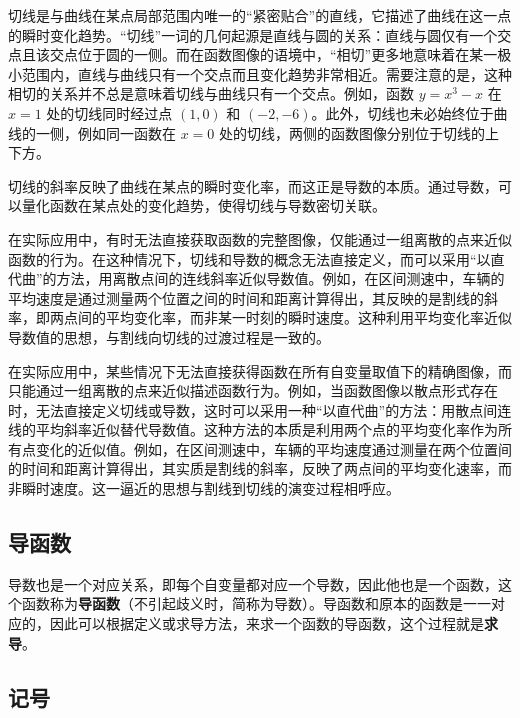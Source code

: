 切线是与曲线在某点局部范围内唯一的“紧密贴合”的直线，它描述了曲线在这一点的瞬时变化趋势。“切线”一词的几何起源是直线与圆的关系：直线与圆仅有一个交点且该交点位于圆的一侧。而在函数图像的语境中，“相切”更多地意味着在某一极小范围内，直线与曲线只有一个交点而且变化趋势非常相近。需要注意的是，这种相切的关系并不总是意味着切线与曲线只有一个交点。例如，函数 $y = x^3 - x$ 在 $x = 1$ 处的切线同时经过点 $(1, 0)$ 和 $(-2, -6)$。此外，切线也未必始终位于曲线的一侧，例如同一函数在 $x = 0$ 处的切线，两侧的函数图像分别位于切线的上下方。




切线的斜率反映了曲线在某点的瞬时变化率，而这正是导数的本质。通过导数，可以量化函数在某点处的变化趋势，使得切线与导数密切关联。

在实际应用中，有时无法直接获取函数的完整图像，仅能通过一组离散的点来近似函数的行为。在这种情况下，切线和导数的概念无法直接定义，而可以采用“以直代曲”的方法，用离散点间的连线斜率近似导数值。例如，在区间测速中，车辆的平均速度是通过测量两个位置之间的时间和距离计算得出，其反映的是割线的斜率，即两点间的平均变化率，而非某一时刻的瞬时速度。这种利用平均变化率近似导数值的思想，与割线向切线的过渡过程是一致的。



在实际应用中，某些情况下无法直接获得函数在所有自变量取值下的精确图像，而只能通过一组离散的点来近似描述函数行为。例如，当函数图像以散点形式存在时，无法直接定义切线或导数，这时可以采用一种“以直代曲”的方法：用散点间连线的平均斜率近似替代导数值。这种方法的本质是利用两个点的平均变化率作为所有点变化的近似值。例如，在区间测速中，车辆的平均速度通过测量在两个位置间的时间和距离计算得出，其实质是割线的斜率，反映了两点间的平均变化速率，而非瞬时速度。这一逼近的思想与割线到切线的演变过程相呼应。

\subsection{导函数}

导数也是一个对应关系，即每个自变量都对应一个导数，因此他也是一个函数，这个函数称为\textbf{导函数}（不引起歧义时，简称为导数）。导函数和原本的函数是一一对应的，因此可以根据定义或求导方法，来求一个函数的导函数，这个过程就是\textbf{求导}。

\subsection{记号}

